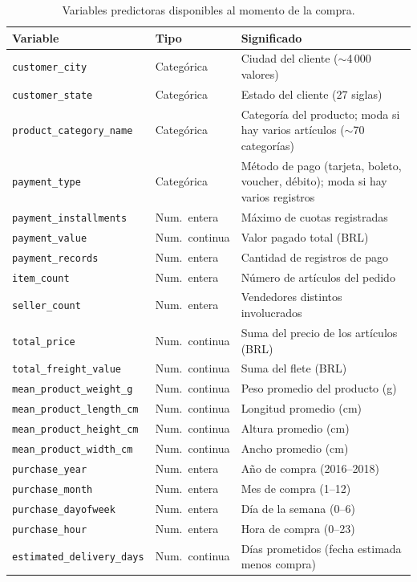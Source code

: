 \documentclass[journal]{IEEEtran}
\begin{document}
\begin{table}[t]
\caption{Variables predictoras disponibles al momento de la compra.}
\label{tab:predictores}
\centering\scriptsize
\begin{tabular}{p{2.8cm}p{1.4cm}p{3.6cm}}
\toprule
Variable & Tipo & Significado \\
\midrule
\texttt{customer\_city} & Categórica & Ciudad del cliente ($\sim$4\,000 valores) \\
\texttt{customer\_state} & Categórica & Estado del cliente (27 siglas) \\
\texttt{product\_category\_name} & Categórica & Categoría del producto; moda si hay varios artículos ($\sim$70 categorías) \\
\texttt{payment\_type} & Categórica & Método de pago (tarjeta, boleto, voucher, débito); moda si hay varios registros \\
\texttt{payment\_installments} & Num.\ entera & Máximo de cuotas registradas \\
\texttt{payment\_value} & Num.\ continua & Valor pagado total (BRL) \\
\texttt{payment\_records} & Num.\ entera & Cantidad de registros de pago \\
\texttt{item\_count} & Num.\ entera & Número de artículos del pedido \\
\texttt{seller\_count} & Num.\ entera & Vendedores distintos involucrados \\
\texttt{total\_price} & Num.\ continua & Suma del precio de los artículos (BRL) \\
\texttt{total\_freight\_value} & Num.\ continua & Suma del flete (BRL) \\
\texttt{mean\_product\_weight\_g} & Num.\ continua & Peso promedio del producto (g) \\
\texttt{mean\_product\_length\_cm} & Num.\ continua & Longitud promedio (cm) \\
\texttt{mean\_product\_height\_cm} & Num.\ continua & Altura promedio (cm) \\
\texttt{mean\_product\_width\_cm} & Num.\ continua & Ancho promedio (cm) \\
\texttt{purchase\_year} & Num.\ entera & Año de compra (2016--2018) \\
\texttt{purchase\_month} & Num.\ entera & Mes de compra (1--12) \\
\texttt{purchase\_dayofweek} & Num.\ entera & Día de la semana (0--6) \\
\texttt{purchase\_hour} & Num.\ entera & Hora de compra (0--23) \\
\texttt{estimated\_delivery\_days} & Num.\ continua & Días prometidos (fecha estimada menos compra) \\
\bottomrule
\end{tabular}
\end{table}
\end{document}
